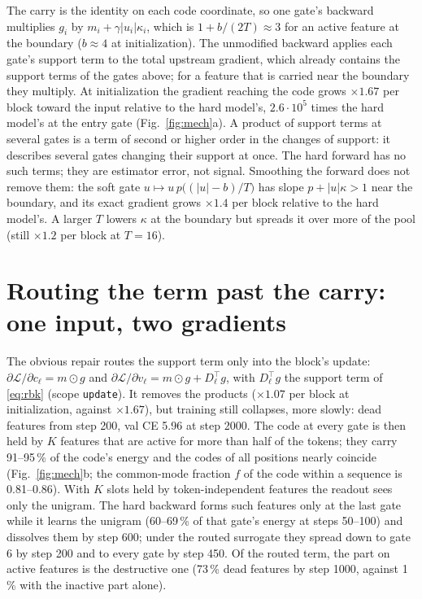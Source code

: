 \documentclass[10pt,a4paper]{article}
\newcommand{\code}[1]{\texttt{#1}}
\begin{document}
The carry is the identity on each code coordinate, so one gate's backward multiplies \(g_i\) by
\(m_i+\gamma|u_i|\kappa_i\), which is \(1+b/(2T)\approx3\) for an active feature at the boundary (\(b\approx4\) at
initialization).  The unmodified backward applies each gate's support term to the total upstream gradient, which
already contains the support terms of the gates above; for a feature that is carried near the boundary they multiply.
At initialization the gradient reaching the code grows \(\times1.67\) per block toward the input relative to the hard
model's, \(2.6\cdot10^5\) times the hard model's at the entry gate (Fig.~\ref{fig:mech}a).  A product of support terms at several gates is a term of
second or higher order in the changes of support: it describes several gates changing their support at once.  The
hard forward has no such terms; they are estimator error, not signal.  Smoothing the forward does not remove them:
the soft gate \(u\mapsto u\,p\bigl((|u|-b)/T\bigr)\) has slope \(p+|u|\kappa>1\) near the boundary, and its exact
gradient grows \(\times1.4\) per block relative to the hard model's.  A larger \(T\) lowers \(\kappa\) at the boundary but
spreads it over more of the pool (still \(\times1.2\) per block at \(T=16\)).

\section{Routing the term past the carry: one input, two gradients}

The obvious repair routes the support term only into the block's update: \(\partial\mathcal L/\partial c_\ell=m\odot g\)
and \(\partial\mathcal L/\partial v_\ell=m\odot g+D_\ell^\top g\), with \(D_\ell^\top g\) the support term of
\eqref{eq:rbk} (scope \code{update}).  It removes the products
(\(\times1.07\) per block at initialization, against \(\times1.67\)), but training still collapses, more slowly: dead features from
step 200, val CE 5.96 at step 2000.  The code at every gate is then held by \(K\) features that are active for more
than half of the tokens; they carry 91--95\,\% of the code's energy and the codes of all positions nearly coincide
(Fig.~\ref{fig:mech}b; the common-mode fraction \(f\) of the code within a sequence is 0.81--0.86).  With \(K\) slots
held by token-independent features the readout sees only the unigram.  The hard backward forms such features only at
the last gate while it learns the unigram (60--69\,\% of that gate's energy at steps 50--100) and dissolves them by
step 600; under the routed surrogate they spread down to gate 6 by step 200 and to every gate by step 450.  Of the
routed term, the part on active features is the destructive one (73\,\% dead features by step 1000, against 1\,\% with
the inactive part alone).
\end{document}
